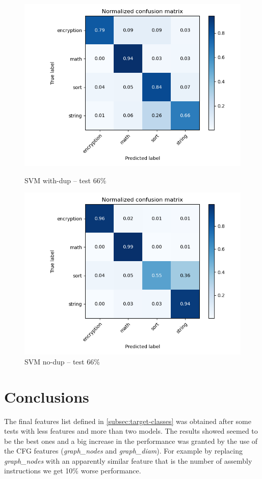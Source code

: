 \documentclass[11pt]{article}
\begin{document}
	\begin{figure}[H]
		\centering
		\begin{minipage}{.5\textwidth}
		  \centering
		  \includegraphics[width=\linewidth]{assets/svc_dup_0.66.png}
		  \caption{SVM with-dup -- test 66\%}
		\end{minipage}%
		\begin{minipage}{.5\textwidth}
		  \centering
		  \includegraphics[width=\linewidth]{assets/svc_nodup_0.66.png}
		  \caption{SVM no-dup -- test 66\%}
		\end{minipage}
	\end{figure}	



	\section{Conclusions}
	The final features list defined in \autoref{subsec:target-classes} was obtained
	after some tests with less features and more than two models. The results showed
	seemed to be the best ones and a big increase in the performance was granted
	by the use of the CFG features (\textit{graph\_nodes} and \textit{graph\_diam}).
	For example by replacing \textit{graph\_nodes} with an apparently similar feature
	that is the number of assembly instructions we get 10\% worse performance.
	
\end{document}
